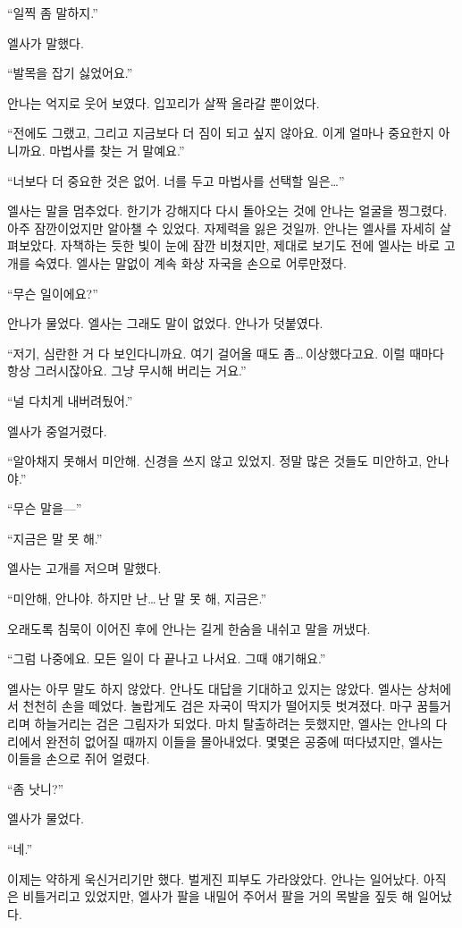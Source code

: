 ``일찍 좀 말하지.''

엘사가 말했다.

``발목을 잡기 싫었어요.''

안나는 억지로 웃어 보였다. 입꼬리가 살짝 올라갈 뿐이었다.

``전에도 그랬고, 그리고 지금보다 더 짐이 되고 싶지 않아요. 이게 얼마나 중요한지 아니까요. 마법사를 찾는 거 말예요.''

``너보다 더 중요한 것은 없어. 너를 두고 마법사를 선택할 일은\ldots''

엘사는 말을 멈추었다. 한기가 강해지다 다시 돌아오는 것에 안나는 얼굴을 찡그렸다. 아주 잠깐이었지만 알아챌 수 있었다. 자제력을 잃은 것일까. 안나는 엘사를 자세히 살펴보았다. 자책하는 듯한 빛이 눈에 잠깐 비쳤지만, 제대로 보기도 전에 엘사는 바로 고개를 숙였다. 엘사는 말없이 계속 화상 자국을 손으로 어루만졌다.

``무슨 일이에요?''

안나가 물었다. 엘사는 그래도 말이 없었다. 안나가 덧붙였다.

``저기, 심란한 거 다 보인다니까요. 여기 걸어올 때도 좀\ldots\,이상했다고요. 이럴 때마다 항상 그러시잖아요. 그냥 무시해 버리는 거요.''

``널 다치게 내버려뒀어.''

엘사가 중얼거렸다.

``알아채지 못해서 미안해. 신경을 쓰지 않고 있었지. 정말 많은 것들도 미안하고, 안나야.''

``무슨 말을—''

``지금은 말 못 해.''

엘사는 고개를 저으며 말했다.

``미안해, 안나야. 하지만 난\ldots\,난 말 못 해, 지금은.''

오래도록 침묵이 이어진 후에 안나는 길게 한숨을 내쉬고 말을 꺼냈다.

``그럼 나중에요. 모든 일이 다 끝나고 나서요. 그때 얘기해요.''

엘사는 아무 말도 하지 않았다. 안나도 대답을 기대하고 있지는 않았다. 엘사는 상처에서 천천히 손을 떼었다. 놀랍게도 검은 자국이 딱지가 떨어지듯 벗겨졌다. 마구 꿈틀거리며 하늘거리는 검은 그림자가 되었다. 마치 탈출하려는 듯했지만, 엘사는 안나의 다리에서 완전히 없어질 때까지 이들을 몰아내었다. 몇몇은 공중에 떠다녔지만, 엘사는 이들을 손으로 쥐어 얼렸다.

``좀 낫니?''

엘사가 물었다.

``네.''

이제는 약하게 욱신거리기만 했다. 벌게진 피부도 가라앉았다. 안나는 일어났다. 아직은 비틀거리고 있었지만, 엘사가 팔을 내밀어 주어서 팔을 거의 목발을 짚듯 해 일어났다.

